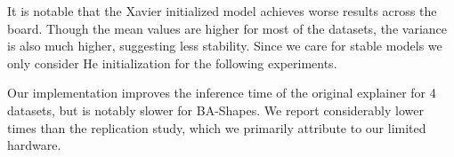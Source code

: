 It is notable that the Xavier initialized model achieves worse results across the board. Though the mean values are higher for most of the datasets, the variance is also much higher, suggesting less stability. Since we care for stable models we only consider He initialization for the following experiments. \bigskip

Our implementation improves the inference time of the original explainer for 4 datasets, but is notably slower for BA-Shapes. We report considerably lower times than the replication study, which we primarily attribute to our limited hardware.








